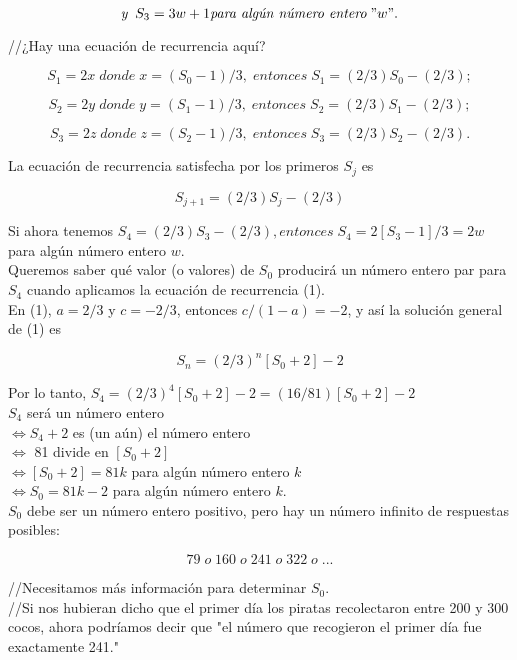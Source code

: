 \documentclass{article}
\begin{document}
$$\textit{y} \;\;
S_{3} = 3w+1 \textit{para algún número entero}\; "w".
$$

//¿Hay una ecuación de recurrencia aquí?

$$
S_{1} = 2x \; \textit{donde}\; x=(S_{0}-1)/3, \; \textit{entonces} \; S_{1} = (2/3)S_0 - (2/3);
$$

$$
S_{2} = 2y \; \textit{donde}\; y=(S_{1}-1)/3, \; \textit{entonces} \; S_{2} = (2/3)S_1 - (2/3);
$$

$$
S_{3} = 2z \; \textit{donde}\; z=(S_{2}-1)/3, \; \textit{entonces} \; S_{3} = (2/3)S_2 - (2/3).
$$

La ecuación de recurrencia satisfecha por los primeros $S_{j}$ es

\begin{equation}
    S_{j+1} = (2/3)S_{j} - (2/3)
\end{equation}

Si ahora tenemos $S_{4}=(2/3)S_{3}-(2/3), \textit{entonces} \; S_{4}=2[S_{3}-1]/3 = 2w$ para algún número entero $w$.\\

Queremos saber qué valor (o valores) de $S_0$ producirá un número entero par para $S_4$ cuando aplicamos la ecuación de recurrencia (1).\\

En (1), $a=2/3$ y $c=-2/3$, entonces $c/(1-a) = -2$, y así la solución general de (1) es

$$
S_{n}= (2/3)^{n}[S_0 + 2] -2
$$

Por lo tanto, $S_{4} = (2/3)^{4}[S_0+2]-2 = (16/81)[S_0 + 2]-2$ \\

$S_4$ será un número entero\\
$\Leftrightarrow S_{4} + 2$ es (un aún) el número entero\\
$\Leftrightarrow$ 81 divide en $[S_0 + 2]$\\
$\Leftrightarrow [S_0 + 2] = 81k$ para algún número entero $k$\\
$\Leftrightarrow S_0 = 81k - 2$ para algún número entero $k$.\\

$S_{0}$ debe ser un número entero positivo, pero hay un número infinito de respuestas posibles:

$$79\; o \;160 \; o \; 241\; o \; 322 \; o\; ...$$

//Necesitamos más información para determinar $S_0$.\\

//Si nos hubieran dicho que el primer día los piratas recolectaron entre 200 y 300 cocos, ahora podríamos decir que "el número que recogieron el primer día fue exactamente 241."
\end{document}
